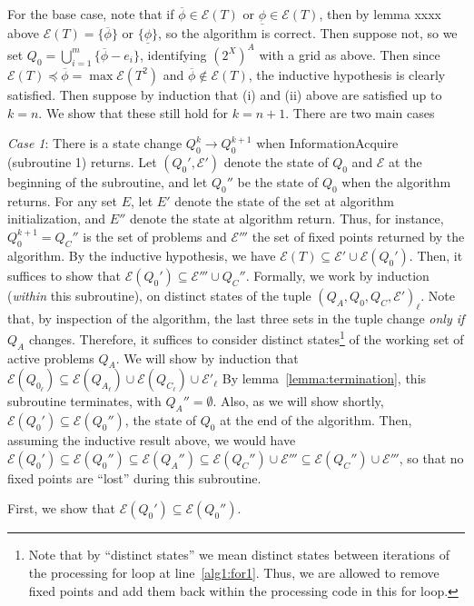 \documentclass[11pt,reqno]{amsart}
\theoremstyle{definition}
\numberwithin{equation}{section}
\newcommand{\ol}{\overline}
\newcommand{\ul}{\underline}
\newcommand{\pre}{\phi}
\newcommand{\prealloc}{(2^X)^A}
\newcommand{\sub}{\subseteq}
\newcommand{\fix}{\mathcal{E}}
\newcommand{\peq}{\preceq}
\newcommand{\toppre}{\ol{\pre}}
\newcommand{\acto}{Q_0}
\newcommand{\actok}{Q_0^k}
\newcommand{\acta}{Q_A}
\newcommand{\actc}{Q_C}
\newcommand{\fixfind}{\mathcal{E}}
\newcommand{\fixtemp}{\mathcal{E}'}
\begin{document}
\begin{enumerate}
For the base case, note that if $\toppre \in \fix(T)$ or $\ul{\pre} \in \fix(T)$, then by lemma xxxx above $\fix(T) = \{\toppre\}$ or $\{\ul{\pre}\}$, so the algorithm is correct. 
Then suppose not, so we set $\acto = \bigcup_{i = 1}^m \{\toppre - e_i\}$, identifying $\prealloc$ with a grid as above.
Then since $\fix(T) \peq \toppre = \max \fix(T^2)$ and $\toppre \not \in \fix(T)$, the inductive hypothesis is clearly satisfied. 
Then suppose by induction that (i) and (ii) above are satisfied up to $k = n$.
We show that these still hold for $k = n +1$.
There are two main cases

\emph{Case 1}: There is a state change $\actok \to \acto^{k +1}$ when InformationAcquire (subroutine 1) returns.
Let $(\acto',\fixfind')$ denote the state of $\acto$ and $\fixfind$ at the beginning of the subroutine, and let $\acto''$ be the state of $\acto$ when the algorithm returns.
For any set $E$, let $E'$ denote the state of the set at algorithm initialization, and $E''$ denote the state at algorithm return.
Thus, for instance, $\acto^{k+1} = \actc''$ is the set of problems and $\fixtemp''$ the set of fixed points returned by the algorithm.
By the inductive hypothesis, we have $\fix(T) \sub \fixfind' \cup \fix(\acto')$.
Then, it suffices to show that $\fix(\acto') \sub \fixtemp'' \cup \actc''$.
Formally, we work by induction (\emph{within} this subroutine), on distinct states of the tuple $(\acta,\acto,\actc,\fixtemp)_{\ell}$.
Note that, by inspection of the algorithm, the last three sets in the tuple change \emph{only if} $\acta$ changes. 
Therefore, it suffices to consider distinct states\footnote{Note that by ``distinct states'' we mean distinct states between iterations of the processing for loop at line~\ref{alg1:for1}.
Thus, we are allowed to remove fixed points and add them back within the processing code in this for loop.} of the working set of active problems $\acta$.
We will show by induction that $\fix(\acto_{\ell}) \sub \fix(\acta_{\ell}) \cup \fix(\actc_{\ell}) \cup \fixtemp_{\ell}$
By lemma~\ref{lemma:termination}, this subroutine terminates, with $\acta'' = \emptyset$. 
Also, as we will show shortly, $\fix(\acto') \sub \fix(\acto'')$, the state of $\acto$ at the end of the algorithm.
Then, assuming the inductive result above, we would have $\fix(\acto') \sub \fix(\acto'') \sub \fix(\acta'') \sub \fix(\actc'') \cup \fixtemp'' \sub \fix(\actc'') \cup \fixtemp''$, so that no fixed points are ``lost'' during this subroutine.

First, we show that $\fix(\acto') \sub \fix(\acto'')$.




















\end{enumerate}
\end{document}
